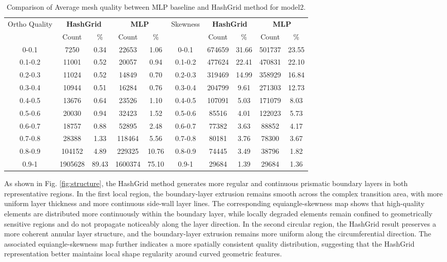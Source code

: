 \documentclass[%
 aip,
 amsmath,amssymb,
 reprint,%
nobibnotes,
]{revtex4-1}
\begin{document}
\begin{table}[t]
    \centering
    \caption{Comparison of Average mesh quality between MLP baseline and HashGrid method for model2.}
    \label{tab:mesh_quality_comparison_smooth}
    \renewcommand{\arraystretch}{1.15}
    \begin{tabular}{c c c c c c c c c c}
        \toprule
        \multirow{2}{*}{Ortho Quality} & \multicolumn{2}{c}{\textbf{HashGrid}} & \multicolumn{2}{c}{\textbf{MLP}} & \multirow{2}{*}{Skewness} & \multicolumn{2}{c}{\textbf{HashGrid}} & \multicolumn{2}{c}{\textbf{MLP}} \\
        \cmidrule(lr){2-3} \cmidrule(lr){4-5} \cmidrule(lr){7-8} \cmidrule(lr){9-10}
        & Count & \% & Count & \% & & Count & \% & Count & \% \\
        \midrule
        0-0.1     &7250   &0.34 &22653  &1.06 &0-0.1  &674659&31.66&501737&23.55 \\
        0.1-0.2   &11001  &0.52 &20057  &0.94 &0.1-0.2&477624&22.41&470831&22.10 \\
        0.2-0.3   &11024  &0.52 &14849  &0.70 &0.2-0.3&319469&14.99&358929&16.84 \\
        0.3-0.4   &10944  &0.51 &16284  &0.76 &0.3-0.4&204799&9.61 &271303&12.73 \\
        0.4-0.5   &13676  &0.64 &23526  &1.10 &0.4-0.5&107091&5.03 &171079&8.03  \\
        0.5-0.6   &20030  &0.94 &32423  &1.52 &0.5-0.6&85516 &4.01 &122023&5.73  \\
        0.6-0.7   &18757  &0.88 &52895  &2.48 &0.6-0.7&77382 &3.63 &88852 &4.17  \\
        0.7-0.8   &28388  &1.33 &118464 &5.56 &0.7-0.8&80181 &3.76 &78300 &3.67  \\
        0.8-0.9   &104152 &4.89 &229325 &10.76&0.8-0.9&74445 &3.49 &38796 &1.82  \\
        0.9-1     &1905628&89.43&1600374&75.10&0.9-1  &29684 &1.39 &29684 &1.36  \\
        \bottomrule
    \end{tabular}
\end{table}

As shown in Fig. \ref{fig:structure}, the HashGrid method generates more regular and continuous prismatic boundary layers in both representative regions. In the first local region, the boundary-layer extrusion remains smooth across the complex transition area, with more uniform layer thickness and more continuous side-wall layer lines. The corresponding equiangle-skewness map shows that high-quality elements are distributed more continuously within the boundary layer, while locally degraded elements remain confined to geometrically sensitive regions and do not propagate noticeably along the layer direction. In the second circular region, the HashGrid result preserves a more coherent annular layer structure, and the boundary-layer extrusion remains more uniform along the circumferential direction.
The associated equiangle-skewness map further indicates a more spatially consistent quality distribution, suggesting that the HashGrid representation better maintains local shape regularity around curved geometric features.
\end{document}
